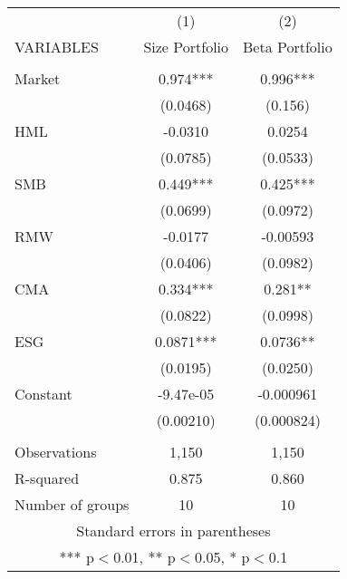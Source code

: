 \begin{tabular}{lcc} \hline
 & (1) & (2) \\
VARIABLES & Size Portfolio & Beta Portfolio \\ \hline
 &  &  \\
Market & 0.974*** & 0.996*** \\
 & (0.0468) & (0.156) \\
HML & -0.0310 & 0.0254 \\
 & (0.0785) & (0.0533) \\
SMB & 0.449*** & 0.425*** \\
 & (0.0699) & (0.0972) \\
RMW & -0.0177 & -0.00593 \\
 & (0.0406) & (0.0982) \\
CMA & 0.334*** & 0.281** \\
 & (0.0822) & (0.0998) \\
ESG & 0.0871*** & 0.0736** \\
 & (0.0195) & (0.0250) \\
Constant & -9.47e-05 & -0.000961 \\
 & (0.00210) & (0.000824) \\
 &  &  \\
Observations & 1,150 & 1,150 \\
R-squared & 0.875 & 0.860 \\
 Number of groups & 10 & 10 \\ \hline
\multicolumn{3}{c}{ Standard errors in parentheses} \\
\multicolumn{3}{c}{ *** p$<$0.01, ** p$<$0.05, * p$<$0.1} \\
\end{tabular}
